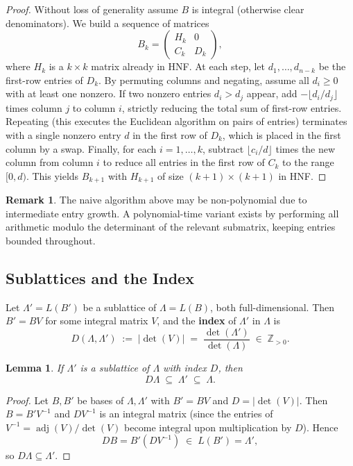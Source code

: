 \documentclass[11pt]{article}
\theoremstyle{plain}
\newtheorem{lemma}[theorem]{Lemma}
\theoremstyle{definition}
\newtheorem{remark}[theorem]{Remark}
\newcommand{\Z}{\mathbb{Z}}
\begin{document}
\begin{proof}
Without loss of generality assume $B$ is integral (otherwise clear denominators). We build a sequence of matrices
\[
  B_k = \begin{pmatrix} H_k & 0 \\ C_k & D_k \end{pmatrix},
\]
where $H_k$ is a $k\times k$ matrix already in HNF. At each step, let $d_1,\ldots,d_{n-k}$ be the first-row entries of $D_k$. By permuting columns and negating, assume all $d_i \ge 0$ with at least one nonzero. If two nonzero entries $d_i > d_j$ appear, add $-\lfloor d_i/d_j \rfloor$ times column $j$ to column $i$, strictly reducing the total sum of first-row entries. Repeating (this executes the Euclidean algorithm on pairs of entries) terminates with a single nonzero entry $d$ in the first row of $D_k$, which is placed in the first column by a swap. Finally, for each $i = 1,\ldots,k$, subtract $\lfloor c_i/d \rfloor$ times the new column from column $i$ to reduce all entries in the first row of $C_k$ to the range $[0, d)$. This yields $B_{k+1}$ with $H_{k+1}$ of size $(k+1)\times(k+1)$ in HNF.
\end{proof}

\begin{remark}
The naive algorithm above may be non-polynomial due to intermediate entry growth. A polynomial-time variant exists by performing all arithmetic modulo the determinant of the relevant submatrix, keeping entries bounded throughout.
\end{remark}

\subsection*{Sublattices and the Index}

Let $\Lambda' = L(B')$ be a sublattice of $\Lambda = L(B)$, both full-dimensional. Then $B' = BV$ for some integral matrix $V$, and the \textbf{index} of $\Lambda'$ in $\Lambda$ is
\[
  D(\Lambda, \Lambda') \;:=\; |\det(V)| \;=\; \frac{\det(\Lambda')}{\det(\Lambda)} \;\in\; \Z_{>0}.
\]

\begin{lemma}
If $\Lambda'$ is a sublattice of $\Lambda$ with index $D$, then
\[
  D\Lambda \;\subseteq\; \Lambda' \;\subseteq\; \Lambda.
\]
\end{lemma}

\begin{proof}
Let $B, B'$ be bases of $\Lambda, \Lambda'$ with $B' = BV$ and $D = |\det(V)|$. Then $B = B' V^{-1}$ and $DV^{-1}$ is an integral matrix (since the entries of $V^{-1} = \operatorname{adj}(V)/\det(V)$ become integral upon multiplication by $D$). Hence
\[
  DB = B'(DV^{-1}) \;\in\; L(B') = \Lambda',
\]
so $D\Lambda \subseteq \Lambda'$.
\end{proof}
\end{document}
